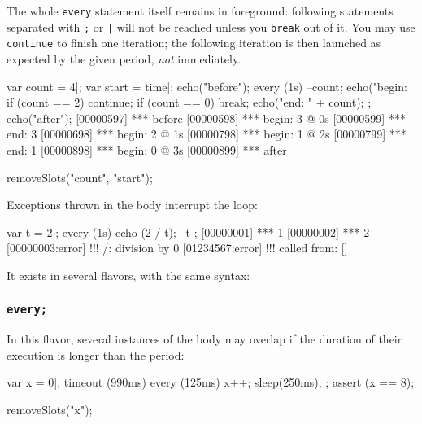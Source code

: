 The whole \lstinline{every} statement itself remains in foreground:
following statements separated with \lstinline';' or \lstinline'|' will not
be reached unless you \lstinline{break} out of it.  You may use
\lstinline{continue} to finish one iteration; the following iteration is
then launched as expected by the given period, \emph{not} immediately.

\begin{urbiscript}
var count = 4|;
var start = time|;
echo("before");
every (1s)
{
  --count;
  echo("begin: %
  if (count == 2)
    continue;
  if (count == 0)
    break;
  echo("end:   " + count);
};
echo("after");
[00000597] *** before
[00000598] *** begin: 3 @ 0s
[00000599] *** end:   3
[00000698] *** begin: 2 @ 1s
[00000798] *** begin: 1 @ 2s
[00000799] *** end:   1
[00000898] *** begin: 0 @ 3s
[00000899] *** after
\end{urbiscript}
\begin{urbicomment}
removeSlots("count", "start");
\end{urbicomment}

Exceptions thrown in the body interrupt the loop:

\begin{urbiscript}
var t = 2|;
every (1s) { echo (2 / t); --t };
[00000001] *** 1
[00000002] *** 2
[00000003:error] !!! /: division by 0
[01234567:error] !!!    called from: []
\end{urbiscript}

It exists in several flavors, with the same syntax:


\subsubsection{\lstinline{every;}}
\label{sec:lang:every:semi}

In this flavor, several instances of the body may overlap if the duration of
their execution is longer than the period:

\begin{urbiscript}
var x = 0|;
timeout (990ms)
  every (125ms)
  {
    x++;
    sleep(250ms);
  };
assert (x == 8);
\end{urbiscript}
\begin{urbicomment}
removeSlots("x");
\end{urbicomment}

